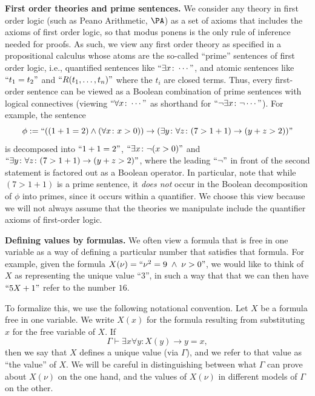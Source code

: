\documentclass[authordate,onecolumn,noenvironments]{miri-tech-article}
\numberwithin{equation}{subsection}
\renewcommand{\implies}{\rightarrow}
\newcommand{\quot}[1]{``#1"}
\newcommand{\enc}[1]{{\underline{#1}}}
\newcommand{\LUV}[1]{#1}%
\newcommand{\tinysection}[1]{\medskip\noindent\textbf{#1.}}
\newcommand{\Theory}{\Gamma}
\begin{document}
\tinysection{First order theories and prime sentences} 
We consider any theory in first order logic (such as Peano Arithmetic, $\PA$) as a set of axioms that includes the axioms of first order logic, so that modus ponens is the only rule of inference needed for proofs.
As such, we view any first order theory as specified in a propositional calculus  whose atoms are the so-called ``prime'' sentences of first order logic, i.e., quantified sentences like $\quot{\exists x \colon \cdots}$, and atomic sentences like $\quot{t_1=t_2}$ and $\quot{R(t_1,\ldots,t_n)}$ where the $t_i$ are closed terms.  Thus, every first-order sentence can be viewed as a Boolean combination of prime sentences with logical connectives (viewing $\quot{\forall x \colon \cdots}$ as shorthand for $\quot{\lnot\exists x \colon \lnot \cdots}$).  For example, the sentence
\[
  \phi := \quot{((1+1=2)\wedge(\forall x \colon x>0))\implies(\exists y \colon \forall z \colon (7>1+1)\implies(y+z>2))}
\]
is decomposed into $\quot{1+1=2}$, $\quot{\exists x \colon \lnot(x>0)}$ and $\quot{\exists y \colon \forall z \colon (7>1+1)\implies(y+z>2)}$, where the leading $\quot{\lnot}$ in front of the second statement is factored out as a Boolean operator.   
In particular, note that while $(7>1+1)$ is a prime sentence, it \emph{does not} occur in the Boolean decomposition of $\phi$ into primes, since it occurs within a quantifier. We choose this view because we will not always assume that the theories we manipulate include the quantifier axioms of first-order logic.

\tinysection{Defining values by formulas} We often view a formula that is free in one variable as a way of defining a particular number that satisfies that formula.  For example, given the formula $X(\nu) = \quot{\nu^2=9 \; \wedge \; \nu>0}$, we would like to think of $X$ as representing the unique value ``3'', in such a way that that we can then have $\quot{5X+1}$ refer to the number $16$.

To formalize this, we use the following notational convention.  Let $\LUV{X}$ be a formula free in one variable.  We write $\LUV{X}(x)$ for the formula resulting from substituting $x$ for the free variable of $\LUV{X}$. If
\[
  \Theory \vdash{\exists x \forall y \colon \LUV{X}(y) \to y=x},
\]
then we say that $\LUV{X}$ defines a unique value (via $\Theory$), and we refer to that value as ``the value'' of $X$. We will be careful in distinguishing between what $\Theory$ can prove about $X(\nu)$ on the one hand, and the values of $X(\nu)$ in different models of $\Theory$ on the other.
\end{document}
